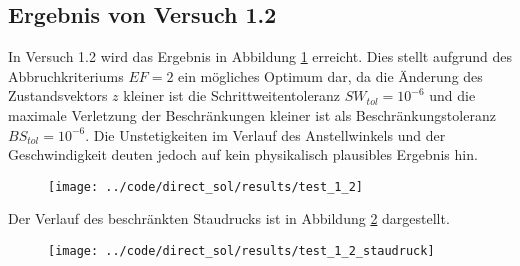 \subsection{Ergebnis von Versuch 1.2}\label{kap:Versuch12}
In Versuch 1.2 wird das Ergebnis in Abbildung \ref{img:test_1_2} erreicht. Dies stellt aufgrund des Abbruchkriteriums $EF = 2$ ein mögliches Optimum dar, da die Änderung des Zustandsvektors $z$ kleiner ist die Schrittweitentoleranz $SW_{tol} = 10^{-6}$ und die maximale Verletzung der Beschränkungen kleiner ist als Beschränkungstoleranz $BS_{tol} = 10^{-6}$. Die Unstetigkeiten im Verlauf des Anstellwinkels und der Geschwindigkeit deuten jedoch auf kein physikalisch plausibles Ergebnis hin.
\begin{figure}[H]
\begin{center}
\texttt{[image: ../code/direct\_sol/results/test\_1\_2]}
 \label{img:test_1_2}
\end{center}
\end{figure}
Der Verlauf des beschränkten Staudrucks ist in Abbildung \ref{img:test_1_2_staudruck} dargestellt.
\begin{figure}[H]
\begin{center}
\texttt{[image: ../code/direct\_sol/results/test\_1\_2\_staudruck]}
 \label{img:test_1_2_staudruck}
\end{center}
\end{figure}
















\newpage
